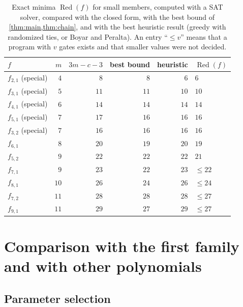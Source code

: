\documentclass{ieeeaccess}
\theoremstyle{plain}
\theoremstyle{definition}
\newcommand{\Red}{\operatorname{Red}}
\begin{document}
\begin{table}[t]
\centering\small
\caption{Exact minima $\Red(f)$ for small members, computed with a SAT solver,
compared with the closed form, with the best bound of \cref{thm:main,thm:chain}, and
with the best heuristic result (greedy with randomized ties, or Boyar and Peralta). An entry ``$\le v$'' means that a program with $v$ gates exists and that smaller
values were not decided.}
\label{tab:exact}
\setlength{\tabcolsep}{4pt}
\begin{tabular}{@{}l r r r r l@{}}
\toprule
$f$ & $m$ & $3m-c-3$ & best bound & heuristic & $\Red(f)$\\
\midrule
$f_{2,1}$ (special) & $4$ & $8$ & $8$ & $6$ & $6$\\
$f_{3,1}$ (special) & $5$ & $11$ & $11$ & $10$ & $10$\\
$f_{4,1}$ (special) & $6$ & $14$ & $14$ & $14$ & $14$\\
$f_{5,1}$ (special) & $7$ & $17$ & $16$ & $16$ & $16$\\
$f_{3,2}$ (special) & $7$ & $16$ & $16$ & $16$ & $16$\\
$f_{6,1}$ & $8$ & $20$ & $19$ & $20$ & $19$\\
$f_{5,2}$ & $9$ & $22$ & $22$ & $22$ & $21$\\
$f_{7,1}$ & $9$ & $23$ & $22$ & $23$ & $\le22$\\
$f_{8,1}$ & $10$ & $26$ & $24$ & $26$ & $\le24$\\
$f_{7,2}$ & $11$ & $28$ & $28$ & $28$ & $\le27$\\
$f_{9,1}$ & $11$ & $29$ & $27$ & $29$ & $\le27$\\
\bottomrule
\end{tabular}
\end{table}

\section{Comparison with the first family and with other polynomials}\label{sec:comparison}

\subsection{Parameter selection}
\end{document}
